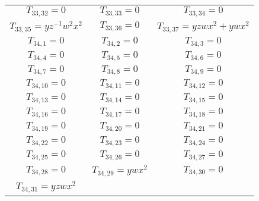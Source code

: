 \begin{longtable}{|c|c|c|}
$T_{33,32}= 0$&

$T_{33,33}= 0$&

$T_{33,34}= 0$\\

$T_{33,35}= yz^{-1}w^2x^2$&

$T_{33,36}= 0$&

$T_{33,37}= yzwx^2+ywx^2$\\

$T_{34,1}= 0$&

$T_{34,2}= 0$&

$T_{34,3}= 0$\\

$T_{34,4}= 0$&

$T_{34,5}= 0$&

$T_{34,6}= 0$\\

$T_{34,7}= 0$&

$T_{34,8}= 0$&

$T_{34,9}= 0$\\

$T_{34,10}= 0$&

$T_{34,11}= 0$&

$T_{34,12}= 0$\\

$T_{34,13}= 0$&

$T_{34,14}= 0$&

$T_{34,15}= 0$\\

$T_{34,16}= 0$&

$T_{34,17}= 0$&

$T_{34,18}= 0$\\

$T_{34,19}= 0$&

$T_{34,20}= 0$&

$T_{34,21}= 0$\\

$T_{34,22}= 0$&

$T_{34,23}= 0$&

$T_{34,24}= 0$\\

$T_{34,25}= 0$&

$T_{34,26}= 0$&

$T_{34,27}= 0$\\

$T_{34,28}= 0$&

$T_{34,29}= ywx^2$&

$T_{34,30}= 0$\\

$T_{34,31}= yzwx^2$&


\end{longtable}
